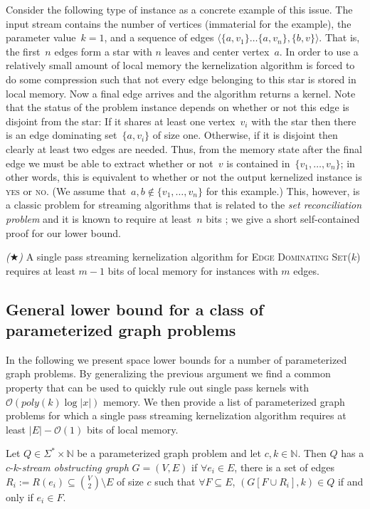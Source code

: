 \documentclass[draft,a4paper]{llncs}
\newcommand{\N}{\mathbb{N}}
\newcommand{\Oh}{\mathcal{O}}
\newcommand{\yes}{\textsc{yes}\xspace}
\newcommand{\no}{\textsc{no}\xspace}
\newcommand{\EDSk}{\textsc{Edge Dominating Set($k$)}\xspace}
\begin{document}
Consider the following type of instance as a concrete example of this issue. The input stream contains the number of vertices (immaterial for the example), the parameter value~$k=1$, and a sequence of edges $\langle \{a, v_1\} \ldots \{a, v_{n}\}, \{b, v\} \rangle$. That is, the first~$n$ edges form a star with $n$ leaves and center vertex~$a$. In order to use a relatively small amount of local memory the kernelization algorithm is forced to do some compression such that not every edge belonging to this star is stored in local memory. Now a final edge arrives and the algorithm returns a kernel. Note that the status of the problem instance depends on whether or not this edge is disjoint from the star: If it shares at least one vertex~$v_i$ with the star then there is an edge dominating set~$\{a,v_i\}$ of size one. Otherwise, if it is disjoint then clearly at least two edges are needed. Thus, from the memory state after the final edge we must be able to extract whether or not~$v$ is contained in~$\{v_1,\ldots,
v_n\}$; in other words, this is equivalent to whether or not the output kernelized instance is \yes or \no. (We assume that~$a,b\notin\{v_1,\ldots,v_n\}$ for this example.) This, however, is a classic problem for streaming algorithms that is related to the \emph{set 
reconciliation problem} and it is known to require at least~$n$ bits \cite{muthukrishnan2005data}; we give a short self-contained proof for our lower bound. 

\begin{theorem} \label{thm:eds}  \emph{($\bigstar$)}
 A single pass streaming kernelization algorithm for \EDSk requires at least $m-1$ bits of local memory for instances with $m$ edges.
\end{theorem}


\subsection*{General lower bound for a class of parameterized graph problems}\label{ssec:singlepass:generallb}

In the following we present space lower bounds for a number of parameterized graph problems. By generalizing the previous argument we find a common property that can be used to quickly rule out single pass kernels with $\Oh(poly(k) \log |x|)$ memory. We then provide a list of parameterized graph problems for which a single pass streaming kernelization algorithm requires at least $|E|- \Oh(1)$ bits of local memory.

\begin{definition}
 Let $Q \in \Sigma^* \times \mathbb{N}$ be a parameterized graph problem and let $c, k \in \N$. Then $Q$ has a $c$-$k$-\emph{stream obstructing graph} $G=(V, E)$ if $\forall e_i \in E$, there is a set of edges $R_i:= R(e_i) \subseteq \binom{V}{2} \setminus E$ of size $c$ such that $\forall F \subseteq E$, $(G[F\cup R_i], k) \in Q$ if and only if $e_i \in F$.
\end{definition}
\end{document}
